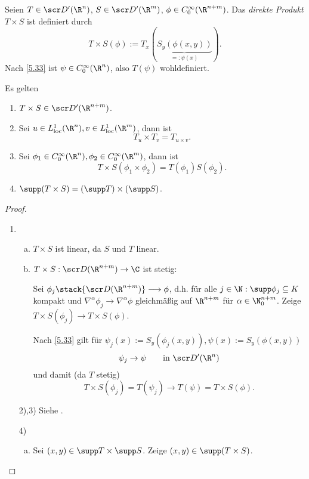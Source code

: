 
\begin{st} \label{5.34}
	Seien $T \in \scr D'(\R^n)$, $S \in \scr D'(\R^m)$, $\phi \in C_0^\infty(\R^{n+m})$.
	Das \emph{direkte Produkt} $T \times S$ ist definiert durch
	\[
		T \times S (\phi)
		:= T_x (\underbrace{S_y (\phi(x,y))}_{=: \psi(x)}).
	\]
	Nach \ref{5.33} ist $\psi \in C_0^\infty(\R^n)$, also $T(\psi)$ wohldefiniert.

	Es gelten
	\begin{enumerate}[1)]
		\item
			$T \times S \in \scr D'(\R^{n+m})$.
		\item
			Sei $u \in L^1_{\text{loc}}(\R^n), v \in L^1_{\text{loc}}(\R^m)$, dann ist
			\[
				T_u \times T_v = T_{u\times v}.
			\]
		\item
			Sei $\phi_1 \in C_0^\infty(\R^n), \phi_2 \in C_0^\infty(\R^m)$, dann ist
			\[
				T \times S (\phi_1 \times \phi_2) = T(\phi_1) S(\phi_2).
			\]
		\item
			$\supp(T \times S) = (\supp T) \times (\supp S)$.
	\end{enumerate}
	\begin{proof}
		\begin{enumerate}[1)]
			\item
				\begin{enumerate}[a)]
					\item
						$T\times S$ ist linear, da $S$ und $T$ linear.
					\item
						$T \times S : \scr D(\R^{n+m}) \to \C$ ist stetig:

						Sei $\phi_j \stack{\scr D(\R^{n+m})}\longrightarrow \phi$, d.h. für alle $j\in \N: \supp \phi_j \subset K$ kompakt und $\nabla^\alpha \phi_j \to \nabla^\alpha \phi$ gleichmäßig auf $\R^{n+m}$ für $\alpha \in \N_0^{n+m}$.
						Zeige $T \times S(\phi_j) \to T\times S(\phi)$.

						Nach \ref{5.33} gilt für $\psi_j(x) := S_y(\phi_j(x,y)), \psi(x) := S_y(\phi(x,y))$
						\[
							\psi_j \to \psi
							\qquad \text{in $\scr D'(\R^n)$}
						\]
						und damit (da $T$ stetig)
						\[
							T \times S (\phi_j)
							= T(\psi_j)
							\to  T(\psi)
							= T \times S (\phi).
						\]
				\end{enumerate}
			\item[2),3)]
				Siehe .
			\item[4)]
				\begin{enumerate}[a)]
					\item
						Sei $(x,y) \in \supp T \times \supp S$.
						Zeige $(x,y) \in \supp (T \times S)$.


\end{enumerate}
\end{enumerate}
\end{proof}
\end{st}
